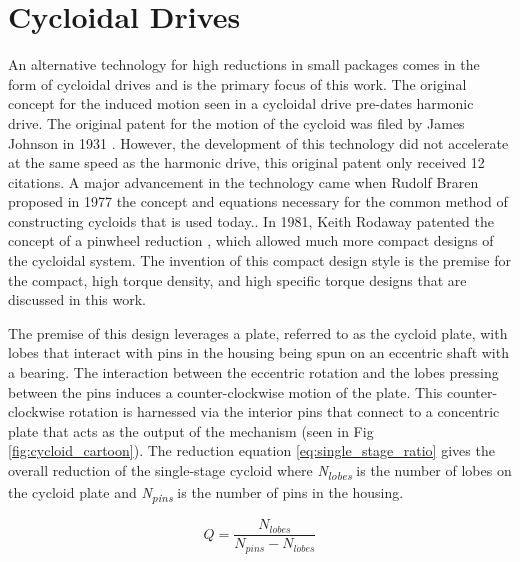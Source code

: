 \section{Cycloidal Drives} \label{intro:cycloid}

An alternative technology for high reductions in small packages comes in the form of cycloidal drives and is the primary focus of this work. The original concept for the induced motion seen in a cycloidal drive pre-dates harmonic drive. The original patent for the motion of the cycloid was filed by James Johnson in 1931 \cite{ref:cycloid_original}. However, the development of this technology did not accelerate at the same speed as the harmonic drive, this original patent only received 12 citations. A major advancement in the technology came when Rudolf Braren proposed in 1977 the concept and equations necessary for the common method of constructing cycloids that is used today.\cite{ref:cycloid_one_stage}. In 1981, Keith Rodaway patented the concept of a pinwheel reduction \cite{ref:cycloid_pinwheel}, which allowed much more compact designs of the cycloidal system. The invention of this compact design style is the premise for the compact, high torque density, and high specific torque designs that are discussed in this work.

The premise of this design leverages a plate, referred to as the cycloid plate, with lobes that interact with pins in the housing being spun on an eccentric shaft with a bearing.
The interaction between the eccentric rotation and the lobes pressing between the pins induces a counter-clockwise motion of the plate. This counter-clockwise rotation is harnessed via the interior pins that connect to a concentric plate that acts as the output of the mechanism (seen in Fig \ref{fig:cycloid_cartoon}). The reduction equation \ref{eq:single_stage_ratio} gives the overall reduction of the single-stage cycloid where \textit{N\textsubscript{lobes}} is the number of lobes on the cycloid plate and \textit{N\textsubscript{pins}} is the number of pins in the housing. 

\begin{equation} \label{eq:single_stage_ratio}
Q = \frac{N_{lobes}} {N_{pins} - N_{lobes}}
\end{equation}

